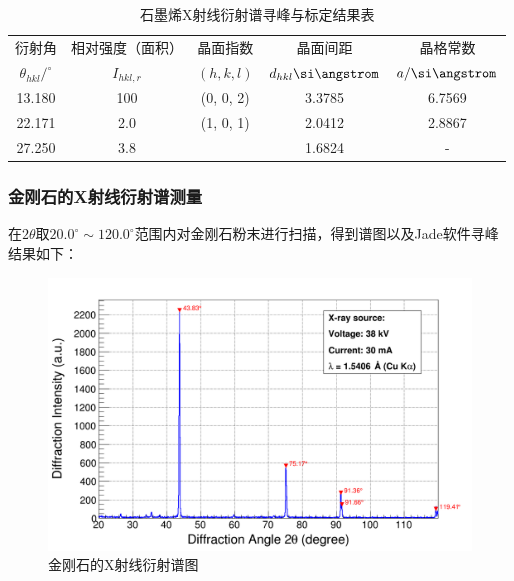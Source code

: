 \documentclass{thuemp}
\begin{document}
\begin{table}
    \centering
    \captionnamefont{\wuhao\bf\heiti}
    \captiontitlefont{\wuhao\bf\heiti}
    \caption{石墨烯X射线衍射谱寻峰与标定结果表}
    \label{tab:graphene_xrd}
    \liuhao
    \begin{tabular}{ccccc}
        \toprule
        衍射角 & 相对强度（面积）& 晶面指数 & 晶面间距 & 晶格常数 \\
        $\theta_{hkl}/^\circ$ & $I_{hkl,r}$ & $(h,k,l)$ & $d_{hkl}\text{\si\angstrom}$ & $a/\text{\si\angstrom}$\\
        \midrule
        13.180 & 100& (0, 0, 2)& 3.3785 & 6.7569 \\
        22.171 & 2.0& (1, 0, 1)& 2.0412 & 2.8867 \\
        27.250 & 3.8&          & 1.6824 &    -   \\
        \bottomrule
    \end{tabular}
\end{table}



\subsubsection{金刚石的X射线衍射谱测量}

在$2\theta$取$20.0^\circ \sim 120.0^\circ$范围内对金刚石粉末进行扫描，得到谱图以及Jade软件寻峰结果如下：

\begin{figure}[H]
    \centering
    \includegraphics[width=0.8\linewidth]{../Data/C-Diamond-multi.png}
    \caption{金刚石的X射线衍射谱图}
    \label{fig:diamond_xrd}
\end{figure}
\end{document}
